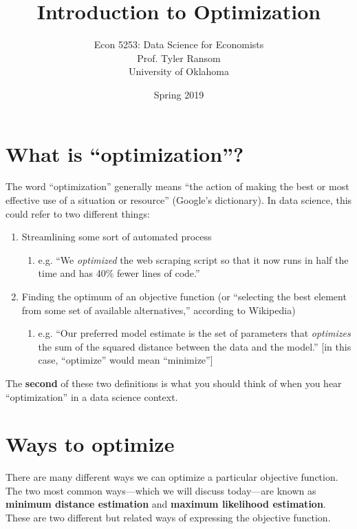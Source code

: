 \documentclass[12pt,english]{article}
\begin{document}
\title{Introduction to Optimization}
\author{Econ 5253: Data Science for Economists\\ Prof. Tyler Ransom\\ University of Oklahoma}
\date{Spring 2019}
\maketitle

\section{What is ``optimization''?}

The word ``optimization'' generally means ``the action of making the best or most effective use of a situation or resource'' (Google's dictionary). In data science, this could refer to two different things:
\begin{enumerate}
    \item Streamlining some sort of automated process
    \begin{enumerate}
        \item e.g. ``We \emph{optimized} the web scraping script so that it now runs in half the time and has 40\% fewer lines of code.''
    \end{enumerate}
    \item Finding the optimum of an objective function (or ``selecting the best element from some set of available alternatives,'' according to Wikipedia)
    \begin{enumerate}
        \item e.g. ``Our preferred model estimate is the set of parameters that \emph{optimizes} the sum of the squared distance between the data and the model.'' {[}in this case, ``optimize'' would mean ``minimize''{]}
    \end{enumerate}
\end{enumerate}
The \textbf{second} of these two definitions is what you should think of when you hear ``optimization'' in a data science context.

\section{Ways to optimize}
There are many different ways we can optimize a particular objective function. The two most common ways---which we will discuss today---are known as \textbf{minimum distance estimation} and \textbf{maximum likelihood estimation}. These are two different but related ways of expressing the objective function.
\end{document}

